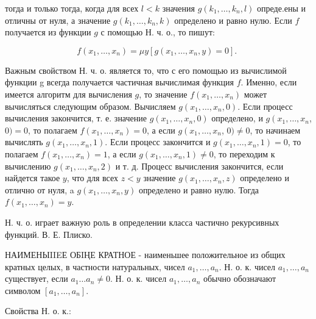 \documentclass[10pt]{article}
\begin{document}
тогда и только тогда, когда для всех $l<k$ значения $g\left(k_{1}, \ldots, k_{n}, l\right)$ опреде.ены и отличны от нуля, а значение $g\left(k_{1}, \ldots, k_{n}, k\right)$ определено и равно нулю. Если $f$ получается из функции $g$ с помощью Н. ч. о., то пишут:



\[

f\left(x_{1}, \ldots, x_{n}\right)=\mu y\left[g\left(x_{1}, \ldots, x_{n}, y\right)=0\right] \text {. }

\]



Важным свойством Н. ч. о. является то, что с его помощью из вычислимой функции g всегда получается частичная вычислимая функция $f$. Именно, если имеется алгоритм для вычисления $g$, то значение $f\left(x_{1}, \ldots, x_{n}\right)$ может вычисляться следующим образом. Вычисляем $g\left(x_{1}, \ldots, x_{n}, 0\right)$. Если процесс вычисления закончится, т. е. значение $g\left(x_{1}, \ldots, x_{n}, 0\right)$ определено, и $g\left(x_{1}, \ldots, x_{n}\right.$, $0)=0$, то полагаем $f\left(x_{1}, \ldots, x_{n}\right)=0$, а если $g\left(x_{1}, \ldots, x_{n}\right.$, $0) \neq 0$, то начинаем вычислять $g\left(x_{1}, \ldots, x_{n}, 1\right)$. Если процесс закончится и $g\left(x_{1}, \ldots, x_{n}, 1\right)=0$, то полагаем $f\left(x_{1}, \ldots, x_{n}\right)=1$, а если $g\left(x_{1}, \ldots, x_{n}, 1\right) \neq 0$, то переходим к вычислению $g\left(x_{1}, \ldots, x_{n}, 2\right)$ и т. д. Процесс вычисления закончится, если найдется такое $y$, что для всех $z<y$ значение $g\left(x_{1}, \ldots, x_{n}, z\right)$ определено и отлично от нуля, a $g\left(x_{1}, \ldots, x_{n}, y\right)$ определено и равно нулю. Тогда $f\left(x_{1}, \ldots, x_{n}\right)=y$.



Н. ч. о. играет важную роль в определении класса частично рекурсивных функций. В. Е. Плиско.



НАИМЕНЫIIEЕ ОБIҢЕ КРАТНОЕ - наименьшее положительное из общих кратных целых, в частности натуральных, чисел $a_{1}, \ldots, a_{n}$. Н. о. к. чисел $a_{1}, \ldots, a_{n}$ существует, если $a_{1} \ldots a_{n} \neq 0$. Н. о. к. чисел $a_{1}, \ldots, a_{n}$ обычно обозначают символом $\left[a_{1}, \ldots, a_{n}\right]$.



Свойства Н. о. к.:
\end{document}
